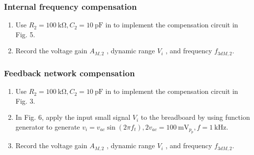 \documentclass[12pt, a4paper]{article}
\begin{document}
\subsubsection{Internal frequency compensation}
\begin{enumerate}[itemsep=0pt]
  \item Use $R_2 = \SI{100}\kohm, C_2 = \SI{10}\pF$ in to 
    implement the compensation circuit in Fig. 5.
  \item Record the voltage gain $A_{M,2}$ , dynamic range $V_i$
    , and frequency $f_{3dM,2}$. 
\end{enumerate}

\subsubsection{Feedback network compensation}
\begin{enumerate}[itemsep=0pt]
  \item Use $R_2 = \SI{100}\kohm, C_2 = \SI{10}\pF$ in to 
    implement the compensation circuit in Fig. 3.
  \item In Fig. 6, apply the input small signal $V_i$ to 
    the breadboard by using function generator to generate
    $v_i = v_{ac} \sin ( 2 \pi f_t) , 2 v_{ac} =
    \SI{100}\mV_{p_p} , f = \SI{1}\kHz$.
  \item Record the voltage gain $A_{M,2}$ , dynamic range $V_i$
    , and frequency $f_{3dM,2}$. 
\end{enumerate}
\end{document}
